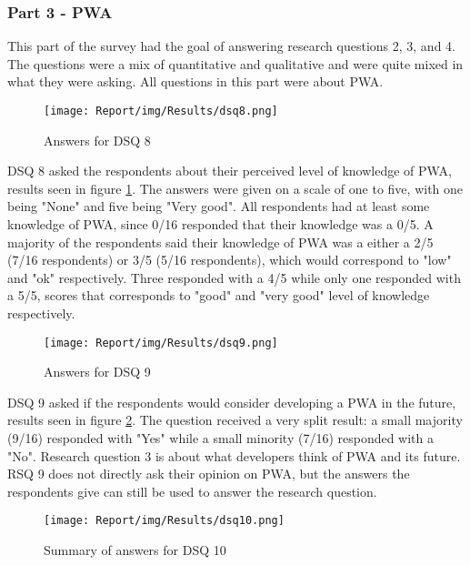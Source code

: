 \documentclass[a4paper,12pt]{article}
\begin{document}
\subsubsection{Part 3 - PWA}
This part of the survey had the goal of answering research questions 2, 3, and 4. The questions were a mix of quantitative and qualitative and were quite mixed in what they were asking. All questions in this part were about PWA.

\begin{figure}[ht!]
    \centering
    \texttt{[image: Report/img/Results/dsq8.png]}
    \caption{Answers for DSQ 8}
    \label{fig:res_devq8}
\end{figure}

DSQ 8 asked the respondents about their perceived level of knowledge of PWA, results seen in figure \ref{fig:res_devq8}. The answers were given on a scale of one to five, with one being "None" and five being "Very good". All respondents had at least some knowledge of PWA, since 0/16 responded that their knowledge was a 0/5. A majority of the respondents said their knowledge of PWA was a either a 2/5 (7/16 respondents) or 3/5 (5/16 respondents), which would correspond to "low" and "ok" respectively. Three responded with a 4/5 while only one responded with a 5/5, scores that corresponds to "good" and "very good" level of knowledge respectively. 

\begin{figure}[ht!]
    \centering
    \texttt{[image: Report/img/Results/dsq9.png]}
    \caption{Answers for DSQ 9}
    \label{fig:res_devq9}
\end{figure}

DSQ 9 asked if the respondents would consider developing a PWA in the future, results seen in figure \ref{fig:res_devq9}. The question received a very split result: a small majority (9/16) responded with "Yes" while a small minority (7/16) responded with a "No". Research question 3 is about what developers think of PWA and its future. RSQ 9 does not directly ask their opinion on PWA, but the answers the respondents give can still be used to answer the research question. 

\begin{figure}[ht!]
    \centering
    \texttt{[image: Report/img/Results/dsq10.png]}
    \caption{Summary of answers for DSQ 10}
    \label{fig:res_devq10}
\end{figure}
\end{document}

